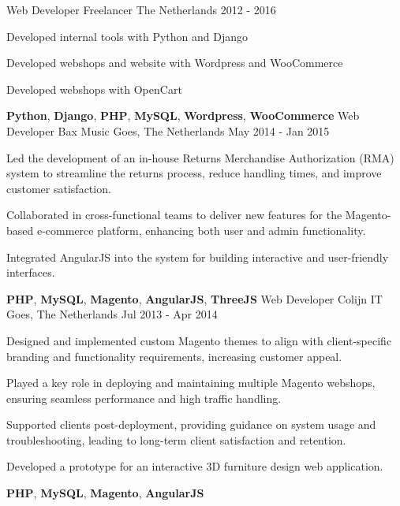 \begin{cventries}

  \cventry
  {Web Developer} %
  {Freelancer} %
  {The Netherlands} %
  {2012 - 2016} %
  {
    \begin{cvitems} %
      \item {Developed internal tools with Python and Django}
      \item {Developed webshops and website with Wordpress and WooCommerce}
      \item {Developed webshops with OpenCart}
    \end{cvitems}
  }
  {\textbf{Python}, \textbf{Django}, \textbf{PHP}, \textbf{MySQL}, \textbf{Wordpress}, \textbf{WooCommerce}}
  \hl

  \cventry
    {Web Developer} %
    {Bax Music} %
    {Goes, The Netherlands} %
    {May 2014 - Jan 2015} %
    {
      \begin{cvitems} %
        \item {Led the development of an in-house Returns Merchandise Authorization (RMA) system to streamline the returns process, reduce handling times, and improve customer satisfaction.}
        \item {Collaborated in cross-functional teams to deliver new features for the Magento-based e-commerce platform, enhancing both user and admin functionality.}
        \item {Integrated AngularJS into the system for building interactive and user-friendly interfaces.}
      \end{cvitems}
    }
    {\textbf{PHP}, \textbf{MySQL}, \textbf{Magento}, \textbf{AngularJS}, \textbf{ThreeJS}}
  \hl

  \cventry
    {Web Developer} %
    {Colijn IT} %
    {Goes, The Netherlands} %
    {Jul 2013 - Apr 2014} %
    {
      \begin{cvitems} %
        \item {Designed and implemented custom Magento themes to align with client-specific branding and functionality requirements, increasing customer appeal.}
        \item {Played a key role in deploying and maintaining multiple Magento webshops, ensuring seamless performance and high traffic handling.  }
        \item {Supported clients post-deployment, providing guidance on system usage and troubleshooting, leading to long-term client satisfaction and retention.}
        \item {Developed a prototype for an interactive 3D furniture design web application.}
      \end{cvitems}
    }
    {\textbf{PHP}, \textbf{MySQL}, \textbf{Magento}, \textbf{AngularJS}}

\end{cventries}

